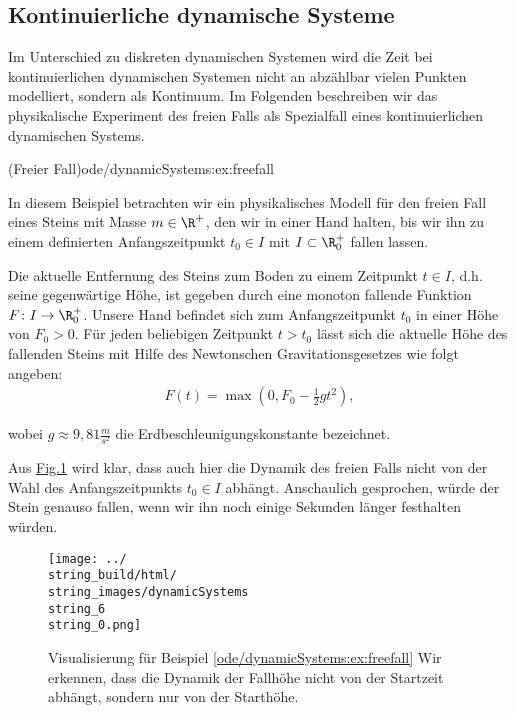 \documentclass[letterpaper,10pt,english]{jupyterBook}
\begin{document}
\subsection{Kontinuierliche dynamische Systeme}
\label{\detokenize{ode/dynamicSystems:kontinuierliche-dynamische-systeme}}
\par
Im Unterschied zu diskreten dynamischen Systemen wird die Zeit bei kontinuierlichen dynamischen Systemen nicht an abzählbar vielen Punkten modelliert, sondern als Kontinuum.
Im Folgenden beschreiben wir das physikalische Experiment des freien Falls als Spezialfall eines kontinuierlichen dynamischen Systems.
\begin{example}{(Freier Fall)}{ode/dynamicSystems:ex:freefall}



\par
In diesem Beispiel betrachten wir ein physikalisches Modell für den freien Fall eines Steins mit Masse \(m \in \R^+\), den wir in einer Hand halten, bis wir ihn zu einem definierten Anfangszeitpunkt \(t_0 \in I\) mit \(I \subset \R^+_0\) fallen lassen.

\par
Die aktuelle Entfernung des Steins zum Boden zu einem Zeitpunkt \(t \in I\), d.h. seine gegenwärtige Höhe, ist gegeben durch eine monoton fallende Funktion \(F \colon I \rightarrow \R^+_0\).
Unsere Hand befindet sich zum Anfangszeitpunkt \(t_0\) in einer Höhe von \(F_0 > 0\).
Für jeden beliebigen Zeitpunkt \(t > t_0\) lässt sich die aktuelle Höhe des fallenden Steins mit Hilfe des Newtonschen Gravitationsgesetzes wie folgt angeben:
\begin{align*}
F(t) = \max(0, F_0 - \frac{1}{2}gt^2),
\end{align*}
\par
wobei \(g \approx 9,81 \frac{m}{s^2}\) die Erdbeschleunigungskonstante bezeichnet.

\par
Aus \hyperref[\detokenize{ode/dynamicSystems:fig-free-fall}]{Fig.\@ \ref{\detokenize{ode/dynamicSystems:fig-free-fall}}} wird klar, dass auch hier die Dynamik des freien Falls nicht von der Wahl des Anfangszeitpunkts \(t_0 \in I\) abhängt.
Anschaulich gesprochen, würde der Stein genauso fallen, wenn wir ihn noch einige Sekunden länger festhalten würden.
\end{example}

\begin{figure}[htbp]
\centering


\noindent\texttt{[image: ../\\string\_build/html/\\string\_images/dynamicSystems\\string\_6\\string\_0.png]}
\caption{Visualisierung für Beispiel \cref{ode/dynamicSystems:ex:freefall}  Wir erkennen, dass die Dynamik der Fallhöhe nicht von der Startzeit abhängt, sondern nur von der Starthöhe.}\label{\detokenize{ode/dynamicSystems:fig-free-fall}}\end{figure}
\end{document}
